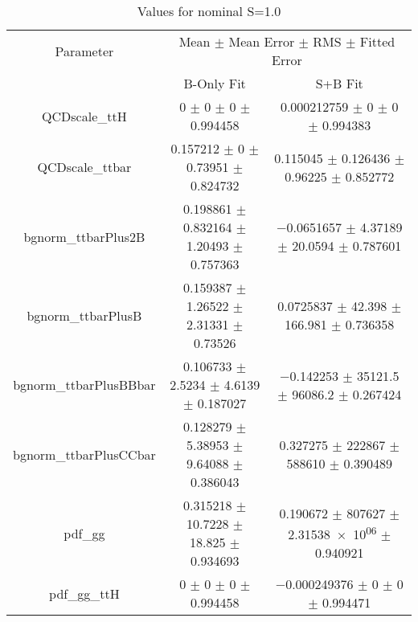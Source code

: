 \begin{table}
\centering
\caption{Values for nominal S=1.0}
\begin{tabular}{ccc}
\toprule
Parameter & \multicolumn{2}{c}{Mean $\pm$ Mean Error $\pm$ RMS $\pm$ Fitted Error}\\
 & B-Only Fit & S+B Fit\\
\midrule
QCDscale\_ttH & \num{0} $\pm$ \num{0} $\pm$ \num{0} $\pm$ \num{0.994458} & \num{0.000212759} $\pm$ \num{0} $\pm$ \num{0} $\pm$ \num{0.994383}\\
QCDscale\_ttbar & \num{0.157212} $\pm$ \num{0} $\pm$ \num{0.73951} $\pm$ \num{0.824732} & \num{0.115045} $\pm$ \num{0.126436} $\pm$ \num{0.96225} $\pm$ \num{0.852772}\\
bgnorm\_ttbarPlus2B & \num{0.198861} $\pm$ \num{0.832164} $\pm$ \num{1.20493} $\pm$ \num{0.757363} & \num{-0.0651657} $\pm$ \num{4.37189} $\pm$ \num{20.0594} $\pm$ \num{0.787601}\\
bgnorm\_ttbarPlusB & \num{0.159387} $\pm$ \num{1.26522} $\pm$ \num{2.31331} $\pm$ \num{0.73526} & \num{0.0725837} $\pm$ \num{42.398} $\pm$ \num{166.981} $\pm$ \num{0.736358}\\
bgnorm\_ttbarPlusBBbar & \num{0.106733} $\pm$ \num{2.5234} $\pm$ \num{4.6139} $\pm$ \num{0.187027} & \num{-0.142253} $\pm$ \num{35121.5} $\pm$ \num{96086.2} $\pm$ \num{0.267424}\\
bgnorm\_ttbarPlusCCbar & \num{0.128279} $\pm$ \num{5.38953} $\pm$ \num{9.64088} $\pm$ \num{0.386043} & \num{0.327275} $\pm$ \num{222867} $\pm$ \num{588610} $\pm$ \num{0.390489}\\
pdf\_gg & \num{0.315218} $\pm$ \num{10.7228} $\pm$ \num{18.825} $\pm$ \num{0.934693} & \num{0.190672} $\pm$ \num{807627} $\pm$ \num{2.31538e+06} $\pm$ \num{0.940921}\\
pdf\_gg\_ttH & \num{0} $\pm$ \num{0} $\pm$ \num{0} $\pm$ \num{0.994458} & \num{-0.000249376} $\pm$ \num{0} $\pm$ \num{0} $\pm$ \num{0.994471}\\
\bottomrule
\end{tabular}
\end{table}
